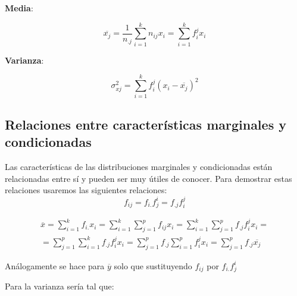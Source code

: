 \documentclass{article}
\theoremstyle{definition}
\begin{document}
	\textbf{Media}:

	$$ \overline{x_j} = \frac{1}{n_{.j}} \sum_{i=1}^k n_{ij} x_i = \sum_{i=1}^k
	f_i^j x_i $$

	\textbf{Varianza}:

	$$ \sigma_{xj}^2 = \sum_{i=1}^k f_i^j {(x_i - \overline{x_j})}^2 $$

\subsection{Relaciones entre características marginales y condicionadas}

	Las características de las distribuciones marginales y condicionadas están
	relacionadas entre sí y pueden ser muy útiles de conocer. Para demostrar estas
	relaciones usaremos las siguientes relaciones: $$f_{ij} = f_{i.} f_j^i =
	f_{.j} f_i^j $$

	\begin{align*} \overline{x} = \sum_{i=1}^k f_{i.} x_i = \sum_{i=1}^{k}
	\sum_{j=1}^{p} f_{ij} x_i =  \sum_{i=1}^{k} \sum_{j=1}^{p} f_{.j} f_i^j x_i =  \\ =
	\sum_{j=1}^p \sum_{i=1}^k f_{.j}f_i^j x_i = \sum_{j=1}^{p} f_{.j}
	\sum_{i=1}^{p} f_i^j  x_i = \sum_{j=1}^p f_{.j} \overline{x_j} \end{align*}

	Análogamente se hace para $\overline{y}$ solo que sustituyendo $f_{ij}$ por
	$f_{i.} f_j^i$

	Para la varianza sería tal que:
\end{document}
